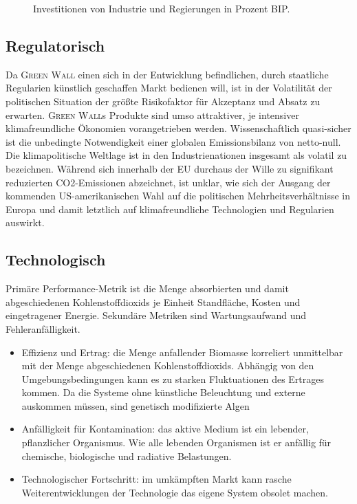             \begin{figure}[h]
                \centering
                
                \caption[Investitionen von Industrie und Regierungen in Prozent BIP]{Investitionen von Industrie und Regierungen in Prozent BIP\cite{Dataset.Eurostat.InvestmentByInstitutionalSectors.2022}.}\label{fig:inv bip}
            \end{figure}

        \subsection{Regulatorisch}

            Da \textsc{Green Wall} einen sich in der Entwicklung befindlichen, durch staatliche Regularien künstlich geschaffen Markt bedienen will, ist in der Volatilität der politischen Situation der größte Risikofaktor für Akzeptanz und Absatz zu erwarten.
            \textsc{Green Wall}s Produkte sind umso attraktiver, je intensiver klimafreundliche Ökonomien vorangetrieben werden. 
            Wissenschaftlich quasi-sicher ist die unbedingte Notwendigkeit einer globalen Emissionsbilanz von netto-null.
            Die klimapolitische Weltlage ist in den Industrienationen insgesamt als volatil zu bezeichnen.
            Während sich innerhalb der EU durchaus der Wille zu signifikant reduzierten CO2-Emissionen abzeichnet, ist unklar, wie sich der Ausgang der kommenden US-amerikanischen Wahl auf die politischen Mehrheitsverhältnisse in Europa und damit letztlich auf klimafreundliche Technologien und Regularien auswirkt.
            
        \subsection{Technologisch}

            Primäre Performance-Metrik ist die Menge absorbierten und damit abgeschiedenen Kohlenstoffdioxids je Einheit Standfläche, Kosten und eingetragener Energie.
            Sekundäre Metriken sind Wartungsaufwand und Fehleranfälligkeit.
            \begin{itemize}
                \item Effizienz und Ertrag: die Menge anfallender Biomasse korreliert unmittelbar mit der Menge abgeschiedenen Kohlenstoffdioxids.
                Abhängig von den Umgebungsbedingungen kann es zu starken Fluktuationen des Ertrages kommen.
                Da die Systeme ohne künstliche Beleuchtung und externe  auskommen müssen, sind genetisch modifizierte Algen 
                \item Anfälligkeit für Kontamination: das aktive Medium ist ein lebender, pflanzlicher Organismus. Wie alle lebenden Organismen ist er anfällig für chemische, biologische und radiative Belastungen.
                \item Technologischer Fortschritt: im umkämpften Markt kann rasche Weiterentwicklungen der Technologie das eigene System obsolet machen.
            \end{itemize}

